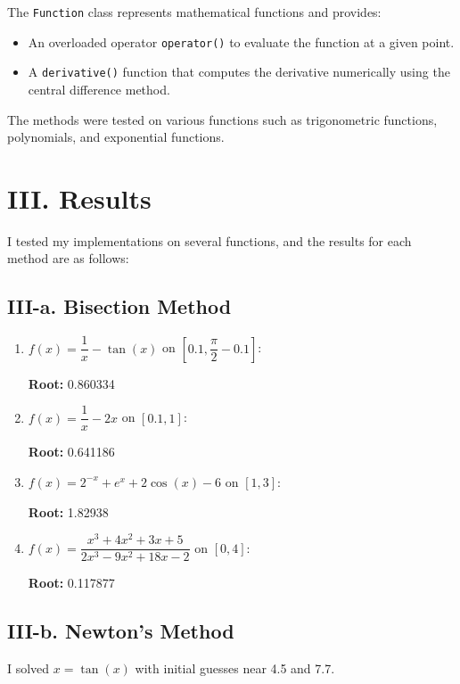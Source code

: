 \documentclass[a4paper]{article}
\begin{document}
The \texttt{Function} class represents mathematical functions and provides:

\begin{itemize}
    \item An overloaded operator \texttt{operator()} to evaluate the function at a given point.
    \item A \texttt{derivative()} function that computes the derivative numerically using the central difference method.
\end{itemize}

The methods were tested on various functions such as trigonometric functions, polynomials, and exponential functions.

\section*{III. Results}

I tested my implementations on several functions, and the results for each method are as follows:

\subsection*{III-a. Bisection Method}

\begin{enumerate}
    \item $f(x) = \dfrac{1}{x} - \tan(x)$ on $[0.1, \dfrac{\pi}{2} - 0.1]$:

    \textbf{Root:} 0.860334

    \item $f(x) = \dfrac{1}{x} - 2x$ on $[0.1, 1]$:

    \textbf{Root:} 0.641186

    \item $f(x) = 2^{-x} + e^{x} + 2\cos(x) - 6$ on $[1, 3]$:

    \textbf{Root:} 1.82938

    \item $f(x) = \dfrac{x^3 + 4x^2 + 3x + 5}{2x^3 - 9x^2 + 18x - 2}$ on $[0, 4]$:

    \textbf{Root:} 0.117877
\end{enumerate}

\subsection*{III-b. Newton's Method}

I solved $x = \tan(x)$ with initial guesses near 4.5 and 7.7.
\end{document}
